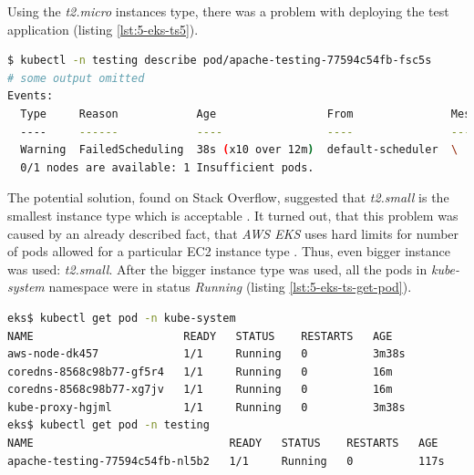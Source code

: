 Using the \textit{t2.micro} instances type, there was a problem with deploying the test application (listing \ref{lst:5-eks-ts5}).
\begin{lstlisting}[basicstyle=\scriptsize,xleftmargin=0cm,label=lst:5-eks-ts5,caption={Debugging a test application},captionpos=b,language=Bash ]
$ kubectl -n testing describe pod/apache-testing-77594c54fb-fsc5s
# some output omitted
Events:
  Type     Reason            Age                 From               Message
  ----     ------            ----                ----               -------
  Warning  FailedScheduling  38s (x10 over 12m)  default-scheduler  \
  0/1 nodes are available: 1 Insufficient pods.
\end{lstlisting}

The potential solution, found on Stack Overflow, suggested that \textit{t2.small} is the smallest instance type which is acceptable \cite{eks-instance-problem-so}. It turned out, that this problem was caused by an already described fact, that \textit{AWS EKS} uses hard limits for number of pods allowed for a particular EC2 instance type \cite{eks-hard-limits}. Thus, even bigger instance was used: \textit{t2.small}. After the bigger instance type was used, all the pods in \textit{kube-system} namespace were in status \textit{Running} (listing \ref{lst:5-eks-ts-get-pod}).
\begin{lstlisting}[basicstyle=\scriptsize,xleftmargin=0cm,label=lst:5-eks-ts-get-pod,caption={Verifying that all the pods are running},captionpos=b,language=Bash ]
eks$ kubectl get pod -n kube-system
NAME                       READY   STATUS    RESTARTS   AGE
aws-node-dk457             1/1     Running   0          3m38s
coredns-8568c98b77-gf5r4   1/1     Running   0          16m
coredns-8568c98b77-xg7jv   1/1     Running   0          16m
kube-proxy-hgjml           1/1     Running   0          3m38s
eks$ kubectl get pod -n testing
NAME                              READY   STATUS    RESTARTS   AGE
apache-testing-77594c54fb-nl5b2   1/1     Running   0          117s
\end{lstlisting}


